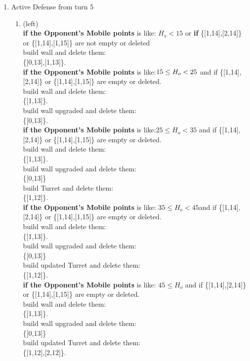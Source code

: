 \documentclass[12pt]{article}
\begin{document}
\begin{enumerate}
\begin{enumerate}
\end{enumerate}
\item Active Defense from turn 5
\begin{enumerate}
\item (left) \\\textbf{if the Opponent's Mobile points} is like: $ H_o < 15$ or \textbf{if}  \{[1,14],[2,14]\} or \{[1,14],[1,15]\} are not empty or deleted \\build wall and delete them:\\ \{[0,13],[1,13]\}. \\ \textbf{if the Opponent's Mobile points} is like:$15 \leq\\ H_o < 25$ and if \{[1,14],[2,14]\} or \{[1,14],[1,15]\} are empty or deleted. \\ build wall and delete them:\\ \{[1,13]\}.\\  build wall upgraded and delete them:\\ \{[0,13]\}.\\ \textbf{if the Opponent's Mobile points} is like:$25 \leq H_o < 35$  and if \{[1,14],[2,14]\} or \{[1,14],[1,15]\} are empty or deleted. \\ build wall and delete them:\\ \{[1,13]\}.\\  build wall upgraded and delete them:\\ \{[0,13]\}\\build Turret and delete them:\\ \{[1,12]\}.\\ \textbf{if the Opponent's Mobile points} is like: $35 \leq H_o < 45$and if \{[1,14],[2,14]\} or \{[1,14],[1,15]\} are empty or deleted. \\ build wall and delete them:\\ \{[1,13]\}.\\  build wall upgraded and delete them:\\ \{[0,13]\}\\build updated Turret and delete them:\\ \{[1,12]\}.\\ \textbf{if the Opponent's Mobile points} is like: $45 \leq H_o $ and if \{[1,14],[2,14]\} or \{[1,14],[1,15]\} are empty or deleted. \\ build wall and delete them:\\ \{[1,13]\}.\\  build wall upgraded and delete them:\\ \{[0,13]\}\\build updated Turret and delete them:\\ \{[1,12],[2,12]\}.

\end{enumerate}
\end{enumerate}
\end{document}

